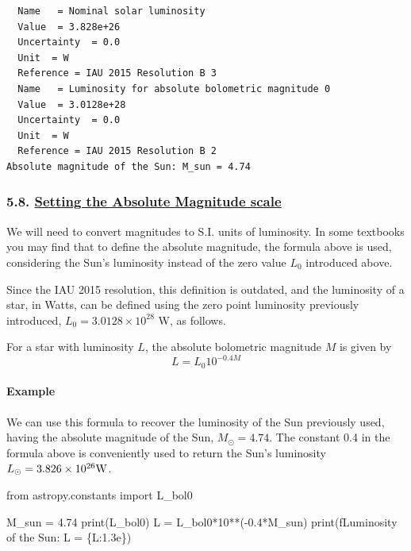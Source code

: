 \documentclass[
  letterpaper,
  DIV=11,
  numbers=noendperiod]{scrartcl}
\let\oldparagraph\paragraph
\renewcommand{\paragraph}[1]{\oldparagraph{#1}\mbox{}}
\newenvironment{Shaded}{\begin{snugshade}}{\end{snugshade}}
\newcommand{\BuiltInTok}[1]{\textcolor[rgb]{0.00,0.23,0.31}{#1}}
\newcommand{\DecValTok}[1]{\textcolor[rgb]{0.68,0.00,0.00}{#1}}
\newcommand{\FloatTok}[1]{\textcolor[rgb]{0.68,0.00,0.00}{#1}}
\newcommand{\ImportTok}[1]{\textcolor[rgb]{0.00,0.46,0.62}{#1}}
\newcommand{\NormalTok}[1]{\textcolor[rgb]{0.00,0.23,0.31}{#1}}
\newcommand{\OperatorTok}[1]{\textcolor[rgb]{0.37,0.37,0.37}{#1}}
\newcommand{\SpecialCharTok}[1]{\textcolor[rgb]{0.37,0.37,0.37}{#1}}
\newcommand{\SpecialStringTok}[1]{\textcolor[rgb]{0.13,0.47,0.30}{#1}}
\begin{document}
\begin{verbatim}
  Name   = Nominal solar luminosity
  Value  = 3.828e+26
  Uncertainty  = 0.0
  Unit  = W
  Reference = IAU 2015 Resolution B 3
  Name   = Luminosity for absolute bolometric magnitude 0
  Value  = 3.0128e+28
  Uncertainty  = 0.0
  Unit  = W
  Reference = IAU 2015 Resolution B 2
Absolute magnitude of the Sun: M_sun = 4.74
\end{verbatim}

\hypertarget{setting-the-absolute-magnitude-scale}{%
\subsubsection{\texorpdfstring{5.8. \protect\hyperlink{toc0_}{Setting
the Absolute Magnitude
scale}}{5.8. Setting the Absolute Magnitude scale}}\label{setting-the-absolute-magnitude-scale}}

We will need to convert magnitudes to S.I. units of luminosity. In some
textbooks you may find that to define the absolute magnitude, the
formula above is used, considering the Sun's luminosity instead of the
zero value \(L_0\) introduced above.

Since the IAU 2015 resolution, this definition is outdated, and the
luminosity of a star, in Watts, can be defined using the zero point
luminosity previously introduced, \(L_0=3.0128\times 10^{28}\) W, as
follows.

For a star with luminosity \(L\), the absolute bolometric magnitude
\(M\) is given by \begin{equation}
L = L_0 10^{-0.4 M}
\end{equation}

\hypertarget{example}{%
\paragraph{Example}\label{example}}

We can use this formula to recover the luminosity of the Sun previously
used, having the absolute magnitude of the Sun, \(M_\odot = 4.74\). The
constant 0.4 in the formula above is conveniently used to return the
Sun's luminosity \(L_\odot = 3.826 \times 10^{26}\rm{W}\).

\begin{Shaded}
\begin{Highlighting}[]
\ImportTok{from}\NormalTok{ astropy.constants }\ImportTok{import}\NormalTok{ L\_bol0}

\NormalTok{M\_sun }\OperatorTok{=} \FloatTok{4.74}
\BuiltInTok{print}\NormalTok{(L\_bol0)}
\NormalTok{L }\OperatorTok{=}\NormalTok{ L\_bol0}\OperatorTok{*}\DecValTok{10}\OperatorTok{**}\NormalTok{(}\OperatorTok{{-}}\FloatTok{0.4}\OperatorTok{*}\NormalTok{M\_sun)}
\BuiltInTok{print}\NormalTok{(}\SpecialStringTok{f\textquotesingle{}Luminosity of the Sun: L = }\SpecialCharTok{\{}\NormalTok{L}\SpecialCharTok{:1.3e\}}\SpecialStringTok{\textquotesingle{}}\NormalTok{)}
\end{Highlighting}
\end{Shaded}
\end{document}
